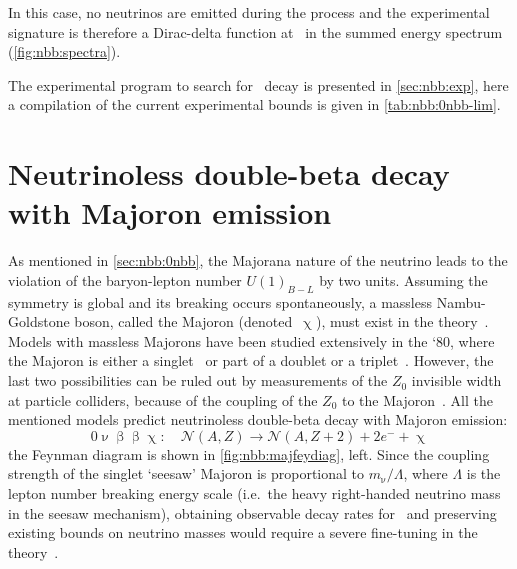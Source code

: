 In this case, no neutrinos are emitted during
the process and the experimental signature is therefore a Dirac-delta function at \qbb\
in the summed energy spectrum (\cref{fig:nbb:spectra}).

The experimental program to search for \onbb\ decay is presented in \cref{sec:nbb:exp},
here a compilation of the current experimental bounds is given in \cref{tab:nbb:0nbb-lim}.

\begin{table}
  \centering
  \caption{%
    Compilation of current most stringent 90\% C.L.~experimental bounds on
    \thalfzero\ and \mbb\ from \gesix, $^{130}$Te and $^{136}$Xe experiments. A
    value of $g_A \simeq 1.27$ is used.
  }\label{tab:nbb:0nbb-lim}
  
\end{table}

\section{Neutrinoless double-beta decay with Majoron emission}%
\label{sec:nbb:0nbbx}

As mentioned in \cref{sec:nbb:0nbb}, the Majorana nature of the neutrino leads
to the violation of the baryon-lepton number $U{(1)}_{B-L}$ by two units.
Assuming the symmetry is global and its breaking occurs spontaneously, a
massless Nambu-Goldstone boson, called the Majoron (denoted~$\upchi$), must exist
in the theory~\cite{Chikashige1981, Schechter1982b, Gelmini1981, Georgi1981,
Mohpatra2004}.  Models with massless Majorons have been studied extensively in
the `80, where the Majoron is either a singlet~\cite{Chikashige1981} or part of
a doublet or a triplet~\cite{Gelmini1981, Georgi1981}. However, the last two
possibilities can be ruled out by measurements of the $Z_0$ invisible width at
particle colliders, because of the coupling of the $Z_0$ to the
Majoron~\cite{Berezhiani1992}. All the mentioned models predict neutrinoless
double-beta decay with Majoron emission:
\[
  0\upnu\upbeta\upbeta\upchi:\quad
    \mathcal{N}(A,Z) \longrightarrow \mathcal{N}(A,Z+2) + 2e^- + \upchi
\]
the Feynman diagram is shown in \cref{fig:nbb:majfeydiag}, left. Since the
coupling strength of the singlet `seesaw' Majoron is proportional to $m_{\upnu} /
\Lambda$, where $\Lambda$ is the lepton number breaking energy scale (i.e.~the
heavy right-handed neutrino mass in the seesaw mechanism), obtaining observable
decay rates for \onbbx\ and preserving existing bounds on neutrino masses would
require a severe fine-tuning in the theory~\cite{Burgess1993, Burgess1994}.

